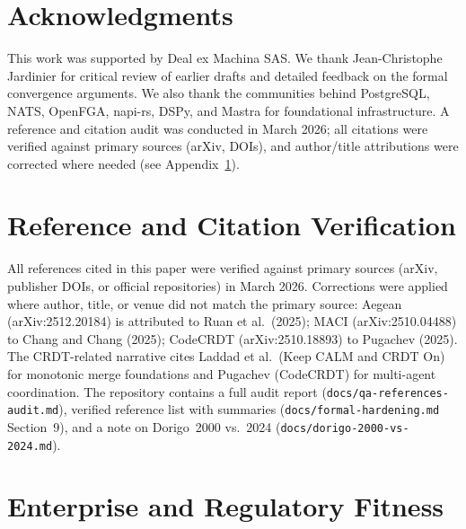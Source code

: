 \documentclass[11pt]{article}
\begin{document}
\section*{Acknowledgments}
This work was supported by Deal ex Machina SAS. We thank Jean-Christophe Jardinier for critical review of earlier drafts and detailed feedback on the formal convergence arguments. We also thank the communities behind PostgreSQL, NATS, OpenFGA, napi-rs, DSPy, and Mastra for foundational infrastructure. A reference and citation audit was conducted in March 2026; all citations were verified against primary sources (arXiv, DOIs), and author/title attributions were corrected where needed (see Appendix~\ref{sec:ref-verification}).




\appendix

\section{Reference and Citation Verification}
\label{sec:ref-verification}

All references cited in this paper were verified against primary sources (arXiv, publisher DOIs, or official repositories) in March 2026. Corrections were applied where author, title, or venue did not match the primary source: Aegean (arXiv:2512.20184) is attributed to Ruan et al.\ (2025); MACI (arXiv:2510.04488) to Chang and Chang (2025); CodeCRDT (arXiv:2510.18893) to Pugachev (2025). The CRDT-related narrative cites Laddad et al.\ (Keep CALM and CRDT On) for monotonic merge foundations and Pugachev (CodeCRDT) for multi-agent coordination. The repository contains a full audit report (\texttt{docs/qa-references-audit.md}), verified reference list with summaries (\texttt{docs/formal-hardening.md} Section~9), and a note on Dorigo~2000 vs.\ 2024 (\texttt{docs/dorigo-2000-vs-2024.md}).

\section{Enterprise and Regulatory Fitness}
\label{sec:enterprise}
\end{document}
